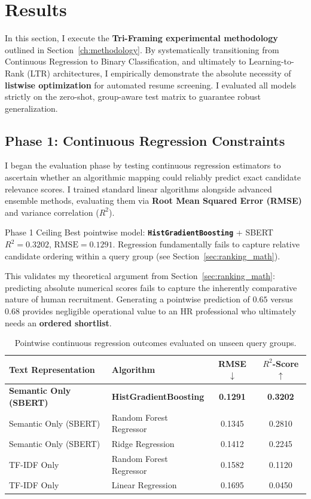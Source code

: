 \chapter{Results}
\label{ch:results}

In this section, I execute the \textbf{Tri-Framing experimental methodology} outlined in Section~\ref{ch:methodology}. By systematically transitioning from Continuous Regression to Binary Classification, and ultimately to Learning-to-Rank (LTR) architectures, I empirically demonstrate the absolute necessity of \textbf{listwise optimization} for automated resume screening. I evaluated all models strictly on the zero-shot, group-aware test matrix to guarantee robust generalization.

\section{Phase 1: Continuous Regression Constraints}

I began the evaluation phase by testing continuous regression estimators to ascertain whether an algorithmic mapping could reliably predict exact candidate relevance scores. I trained standard linear algorithms alongside advanced ensemble methods, evaluating them via \textbf{Root Mean Squared Error (RMSE)} and variance correlation (\textbf{$R^2$}).

\begin{keyresult}{Phase 1 Ceiling}
Best pointwise model: \textbf{\texttt{HistGradientBoosting}} + SBERT \quad $R^2 = \mathbf{0.3202}$, $\text{RMSE} = \mathbf{0.1291}$. Regression fundamentally fails to capture relative candidate ordering within a query group (see Section~\ref{sec:ranking_math}).
\end{keyresult}

This validates my theoretical argument from Section~\ref{sec:ranking_math}: predicting absolute numerical scores fails to capture the inherently comparative nature of human recruitment. Generating a pointwise prediction of $0.65$ versus $0.68$ provides negligible operational value to an HR professional who ultimately needs an \textbf{ordered shortlist}.

\begin{table}[htbp]
\centering
\caption{Pointwise continuous regression outcomes evaluated on unseen query groups.}
\label{tab:regression_results}
\begin{tabular}{@{}llcc@{}}
\toprule
\textbf{Text Representation} & \textbf{Algorithm} & \textbf{RMSE} $\downarrow$ & $R^2$\textbf{-Score} $\uparrow$ \\
\midrule
\textbf{Semantic Only (SBERT)} & \textbf{HistGradientBoosting} & \textbf{0.1291} & \textbf{0.3202} \\
Semantic Only (SBERT) & Random Forest Regressor & 0.1345 & 0.2810 \\
Semantic Only (SBERT) & Ridge Regression & 0.1412 & 0.2245 \\
\addlinespace
TF-IDF Only & Random Forest Regressor & 0.1582 & 0.1120 \\
TF-IDF Only & Linear Regression & 0.1695 & 0.0450 \\
\bottomrule
\end{tabular}
\end{table}

